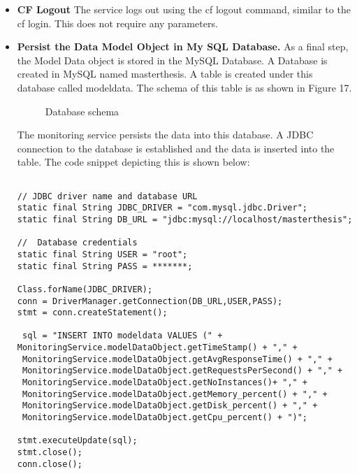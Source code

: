 \documentclass[article,type=msc,colorback,12pt,accentcolor=tud7b]{tudthesis}
\begin{document}
\begin{itemize}
\begin{lstlisting}
\end{lstlisting}
		
\item{\textbf{CF Logout}} The service logs out using the cf logout command, similar to the cf login. This does not require any parameters.
		
\item{\textbf{Persist the Data Model Object in My SQL Database.}} As  a final step, the Model Data object is stored in the MySQL Database. A Database is created in MySQL named masterthesis. A table is created under this database called modeldata. The schema of this table is as shown in Figure 17.

 \begin{figure}[h]
 	\begin{center}
 		\makebox[\textwidth]{\texttt{[image: D5]}}
 	\end{center}
 	\caption{Database schema}
 \end{figure}	

The monitoring service persists the data into this database. A JDBC connection to the database is established and the data is inserted into the table. The code snippet depicting this is shown below:

\begin{lstlisting}

// JDBC driver name and database URL
static final String JDBC_DRIVER = "com.mysql.jdbc.Driver";  
static final String DB_URL = "jdbc:mysql://localhost/masterthesis";

//  Database credentials
static final String USER = "root";
static final String PASS = *******;

Class.forName(JDBC_DRIVER);
conn = DriverManager.getConnection(DB_URL,USER,PASS);
stmt = conn.createStatement();

 sql = "INSERT INTO modeldata VALUES (" + MonitoringService.modelDataObject.getTimeStamp() + "," + 
 MonitoringService.modelDataObject.getAvgResponseTime() + "," + 
 MonitoringService.modelDataObject.getRequestsPerSecond() + "," + 
 MonitoringService.modelDataObject.getNoInstances()+ "," + 
 MonitoringService.modelDataObject.getMemory_percent() + "," + 
 MonitoringService.modelDataObject.getDisk_percent() + "," +
 MonitoringService.modelDataObject.getCpu_percent() + ")";				

stmt.executeUpdate(sql);
stmt.close();	    
conn.close();	    
\end{lstlisting}
		
\end{itemize}	
		
\end{document}
